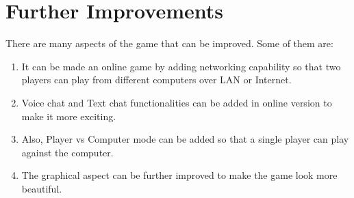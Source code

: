 \documentclass[main]{subfiles}
\begin{document}
\section{Further Improvements}
There are many aspects of the game that can be improved. Some of them are:
\begin{enumerate}
    \item It  can  be  made  an  online  game  by adding networking capability so that two players can play from different computers over LAN or Internet.
    
    \item Voice chat and Text chat functionalities can be added in online version to make it more exciting.
 
    \item Also, Player vs Computer mode can be added so that a single player can play against the computer. 
 
    \item The graphical aspect can be further improved to make the game look more beautiful.
\end{enumerate}
\end{document}
